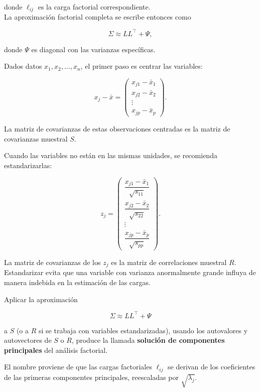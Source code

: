 \documentclass[
]{book}
\begin{document}
donde \(\ell_{ij}\) es la carga factorial correspondiente.\\
La aproximación factorial completa se escribe entonces como

\[
\Sigma \approx LL^\top + \Psi,
\]

donde \(\Psi\) es diagonal con las varianzas específicas.

Dados datos \(x_1, x_2, \dots, x_n\), el primer paso es centrar las variables:

\[
x_j - \bar{x} = 
\begin{pmatrix}
x_{j1} - \bar{x}_1 \\
x_{j2} - \bar{x}_2 \\
\vdots \\
x_{jp} - \bar{x}_p
\end{pmatrix}.
\]

La matriz de covarianzas de estas observaciones centradas es la matriz de covarianzas muestral \(S\).

Cuando las variables no están en las mismas unidades, se recomienda estandarizarlas:

\[
z_j =
\begin{pmatrix}
\dfrac{x_{j1} - \bar{x}_1}{\sqrt{s_{11}}} \\
\dfrac{x_{j2} - \bar{x}_2}{\sqrt{s_{22}}} \\
\vdots \\
\dfrac{x_{jp} - \bar{x}_p}{\sqrt{s_{pp}}}
\end{pmatrix}.
\]

La matriz de covarianzas de los \(z_j\) es la matriz de correlaciones muestral \(R\). Estandarizar evita que una variable con varianza anormalmente grande influya de manera indebida en la estimación de las cargas.

Aplicar la aproximación

\[
\Sigma \approx LL^\top + \Psi
\]

a \(S\) (o a \(R\) si se trabaja con variables estandarizadas), usando los autovalores y autovectores de \(S\) o \(R\), produce la llamada \textbf{solución de componentes principales} del análisis factorial.

El nombre proviene de que las cargas factoriales \(\ell_{ij}\) se derivan de los coeficientes de las primeras componentes principales, reescaladas por \(\sqrt{\lambda_j}\).
\end{document}
